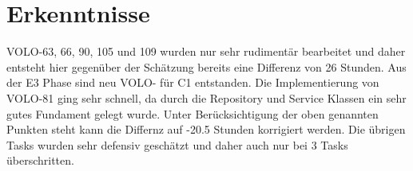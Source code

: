 	\section{Erkenntnisse}
	VOLO-63, 66, 90, 105 und 109 wurden nur sehr rudimentär bearbeitet und daher entsteht hier gegenüber der Schätzung bereits eine Differenz von 26 Stunden. Aus der E3 Phase sind neu VOLO- für C1 entstanden.
	Die Implementierung von VOLO-81 ging sehr schnell, da durch die Repository und Service Klassen ein sehr gutes Fundament gelegt wurde.
	Unter Berücksichtigung der oben genannten Punkten steht kann die Differnz auf -20.5 Stunden korrigiert werden. Die übrigen Tasks wurden sehr defensiv geschätzt und daher auch nur bei 3 Tasks überschritten.